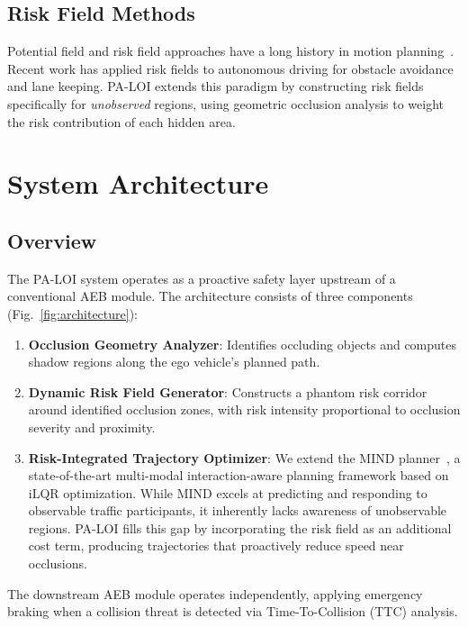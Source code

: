 \documentclass[conference]{IEEEtran}
\begin{document}
\subsection{Risk Field Methods}
Potential field and risk field approaches have a long history in motion planning~\cite{khatib1986potential}. Recent work has applied risk fields to autonomous driving for obstacle avoidance and lane keeping. PA-LOI extends this paradigm by constructing risk fields specifically for \emph{unobserved} regions, using geometric occlusion analysis to weight the risk contribution of each hidden area.

\section{System Architecture}

\subsection{Overview}
The PA-LOI system operates as a proactive safety layer upstream of a conventional AEB module. The architecture consists of three components (Fig.~\ref{fig:architecture}):

\begin{enumerate}
    \item \textbf{Occlusion Geometry Analyzer}: Identifies occluding objects and computes shadow regions along the ego vehicle's planned path.
    \item \textbf{Dynamic Risk Field Generator}: Constructs a phantom risk corridor around identified occlusion zones, with risk intensity proportional to occlusion severity and proximity.
    \item \textbf{Risk-Integrated Trajectory Optimizer}: We extend the MIND planner~\cite{mind2025}, a state-of-the-art multi-modal interaction-aware planning framework based on iLQR optimization. While MIND excels at predicting and responding to observable traffic participants, it inherently lacks awareness of unobservable regions. PA-LOI fills this gap by incorporating the risk field as an additional cost term, producing trajectories that proactively reduce speed near occlusions.
\end{enumerate}

The downstream AEB module operates independently, applying emergency braking when a collision threat is detected via Time-To-Collision (TTC) analysis.
\end{document}
